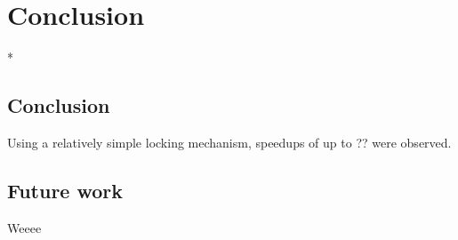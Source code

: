 \chapter{Conclusion}*

\section{Conclusion}
Using a relatively simple locking mechanism, speedups of up to
?? were observed.

\section{Future work}
Weeee


